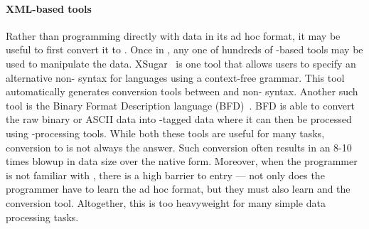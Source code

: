 


\paragraph*{XML-based tools}
Rather than programming directly with data in its ad hoc format,
it may be useful to first convert it to \xml.  Once in \xml,
any one of hundreds of \xml-based tools may be used to manipulate the data.
XSugar~\cite{brabrand+:xsugar2005} is one tool that
allows users to specify an
alternative non-\xml{} syntax for \xml{} languages using a
context-free grammar.  This tool automatically generates conversion
tools between \xml{} and non-\xml{} syntax.  Another such tool is
the Binary Format
Description language (BFD)~\cite{bfd}.  BFD is able
to convert the raw binary or ASCII 
data into \xml{}-tagged data where it can then be
processed using \xml{}-processing tools.  While both these tools are
useful for many tasks, conversion to \xml{} is not always the answer.
Such conversion often results in an 8-10 times blowup in data size
over the native form.  Moreover, when the programmer is not familiar with
\xml, there is a high barrier to entry --- not 
only does the programmer have to learn the ad hoc format, 
but they must also learn \xml{} and
the \xml{} conversion tool.  Altogether, this is too heavyweight for
many simple data processing tasks.

